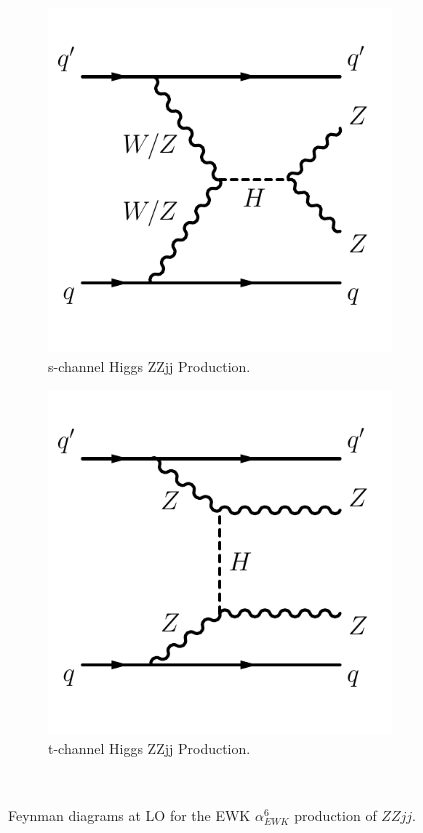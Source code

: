 \begin{figure}[ht]
\begin{subfigure}{.48\textwidth}
  \label{fig:ZZjjFeynmanDiag_EWk_b}
\end{subfigure}
\begin{subfigure}{.48\textwidth}
  \centering
  \includegraphics[width=.8\linewidth]{figures/Theory/diagramEWZZjjSchnHiggs.pdf}  
  \caption{s-channel Higgs ZZjj Production.}
  \label{fig:ZZjjFeynmanDiag_EWk_c}
\end{subfigure}
\begin{subfigure}{.48\textwidth}
  \centering
  \includegraphics[width=.8\linewidth]{figures/Theory/diagramEWZZjjTchnHiggs.pdf}  
  \caption{t-channel Higgs ZZjj Production.}
  \label{fig:ZZjjFeynmanDiag_EWk_d}
\end{subfigure}\\
\caption{Feynman diagrams at LO for the EWK $\alpha_{EWK}^6$ production of $ZZjj$.}
\label{fig:ZZjjFeynmanDiag_EWk}
\end{figure}

